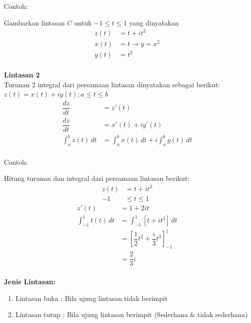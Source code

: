 \documentclass{article}
\begin{document}
Contoh:

Gambarkan lintasan  $C$ untuk $-1 \leq t \leq 1$ yang dinyatakan
\begin{align}
    z(t) & = t + it^2
    \nonumber                     \\
    x(t) & = t \rightarrow y= x^2
    \nonumber                     \\
    y(t) & = t^2
    \nonumber
\end{align}
\leavevmode\\

\textbf{Lintasan 2}
\\

Turunan 2 integral dari persamaan lintasan dinyatakan sebagai berikut:
$z(t) =x(t) +i y(t) ; a \leq t \leq b$
\begin{align}
    \dfrac{dz}{dt}         & = z'(t)
    \nonumber                                                                   \\
    \dfrac{dz}{dt}         & = x'(t) + iy'(t)
    \nonumber                                                                   \\
    \int_{a}^{b} z(t) \,dt & =\int_{a}^{b} x(t) \,dt + i \int_{a}^{b} y(t) \,dt
    \nonumber
\end{align}
\leavevmode\\

Contoh:

Hitung turunan dan integral dari persamaan lintasan berikut:
\begin{align}
    z(t) & = t + it^2
    \nonumber            \\
    -1   & \leq t \leq 1
    \nonumber
\end{align}
\begin{align}
    z'(t)                   & = 1 + 2it
    \nonumber                                                               \\
    \int_{-1}^{1} t(t) \,dt & = \int_{-1}^{1} [t + it^2] \,dt
    \nonumber                                                               \\
                            & = [\dfrac{1}{2}t^2 + \dfrac{i}{3}t^3]_{-1} ^1
    \nonumber                                                               \\
                            & = \dfrac{2}{3}i
    \nonumber
\end{align}
\leavevmode\\

\textbf{Jenis Lintasan:}
\begin{enumerate}
    \item Lintasan buka : Bila ujung lintasan tidak berimpit
    \item Lintasan tutup : Bila ujung lintasan berimpit (Sederhana \& tidak sederhana)
\end{enumerate}
\leavevmode\\
\end{document}
